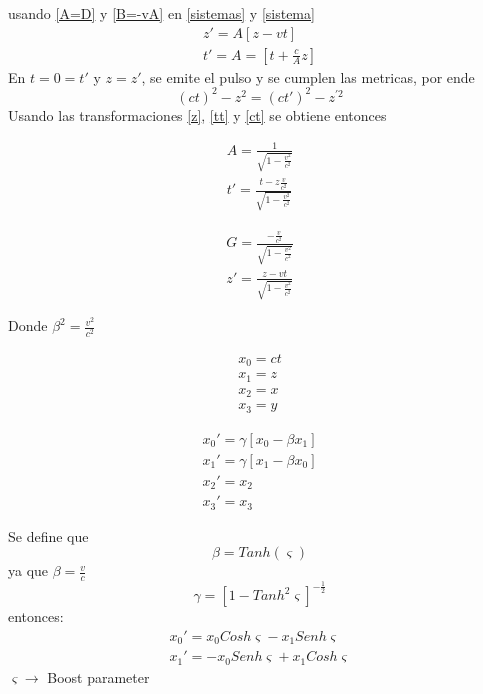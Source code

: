 \documentclass[12pt,letterpaper]{report}
\begin{document}
usando \ref{A=D} y \ref{B=-vA} en \ref{sistemas} y \ref{sistema}
\begin{eqnarray}
    \label{z}
    z'=A[z-vt]\\
    t'=A=\left[t+\frac{c}{A}z \right]
    \label{tt}
\end{eqnarray}
En $t=0=t'$ y $z=z'$, se emite el pulso y se cumplen las metricas, por ende
\begin{equation}
    (ct)^2-z^2=(ct')^2-z^{'2}
    \label{ct}
\end{equation}
Usando las transformaciones \ref{z}, \ref{tt} y \ref{ct} se obtiene entonces\\
\begin{minipage}{0.5\linewidth}
\begin{eqnarray*}
A=\frac{1}{\sqrt{1-\frac{v^2}{c^2}}}\\
t'=\frac{t-z\frac{v}{c^2}}{\sqrt{1-\frac{v^2}{c^2}}}
\end{eqnarray*}
\end{minipage}
\begin{minipage}{0.5\linewidth}
\begin{eqnarray*}
G=\frac{-\frac{v}{c^2}}{\sqrt{1-\frac{v^2}{c^2}}}\\
z'=\frac{z-vt}{\sqrt{1-\frac{v^2}{c^2}}}
\end{eqnarray*}
\end{minipage}
Donde $\beta^2=\frac{v^2}{c^2}$\\
\begin{minipage}{0.5\linewidth}
\begin{eqnarray*}
x_0=ct\\
x_1=z\\
x_2=x\\
x_3=y
\end{eqnarray*}
\end{minipage}
\begin{minipage}{0.5\linewidth}
\begin{eqnarray*}
x_0'=\gamma[x_0-\beta x_1]\\
x_1'=\gamma[x_1-\beta x_0]\\
x_2'=x_2\\
x_3'=x_3
\end{eqnarray*}
\end{minipage}
Se define que
\begin{equation}
    \beta=Tanh(\varsigma)
    \label{beta}
\end{equation}
ya que $\beta=\frac{v}{c}$
\begin{equation}
    \gamma=[1-Tanh^2\varsigma]^{-\frac{1}{2}}
    \label{gamma}
\end{equation}
entonces:
\begin{eqnarray*}
    x_0'=x_0Cosh \varsigma - x_1 Senh \varsigma \\
    x_1'=-x_0Senh \varsigma +x_1Cosh\varsigma
\end{eqnarray*}
$\varsigma \rightarrow$ Boost parameter 
\pagebreak
\end{document}
